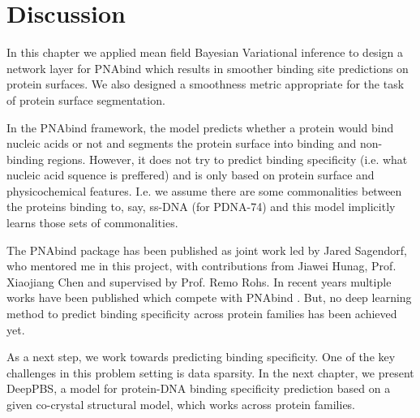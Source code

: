 \section{Discussion}
In this chapter we applied mean field Bayesian Variational inference to
design a network layer for PNAbind which results in smoother binding site predictions on protein surfaces. We also designed a smoothness metric appropriate for the task of protein surface segmentation.

In the PNAbind framework, the model predicts whether a protein would bind nucleic acids or not and segments the protein surface into binding and non-binding regions. However, it does not try to predict binding specificity (i.e. what nucleic acid squence is preffered) and is only based on protein surface and physicochemical features. I.e. we assume there are some commonalities between the proteins binding to, say, ss-DNA (for PDNA-74) and this model implicitly learns those sets of commonalities. 

The PNAbind package has been published as joint work led by Jared Sagendorf, who mentored me in this project, with contributions from Jiawei Hunag, Prof. Xiaojiang Chen and supervised by Prof. Remo Rohs\citep{Sagendorf2024}. In recent years multiple works have been published which compete with PNAbind \citep{gainza2020deciphering, gligorijevic2021structure, yuan2022alphafold2, xia2021graphbind, tubiana2022scannet, krapp2023pesto, li2023geobind, sverrisson2021fast}. But, no deep learning method to predict binding specificity across protein families has been achieved yet.

As a next step, we work towards predicting binding specificity. One of the key challenges in this problem setting is data sparsity. In the next chapter, we present DeepPBS, a model for protein-DNA binding specificity prediction based on a given co-crystal structural model, which works across protein families.  
